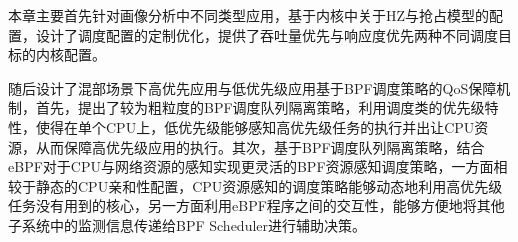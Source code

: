 本章主要首先针对画像分析中不同类型应用，基于内核中关于HZ与抢占模型的配置，设计了调度配置的定制优化，提供了吞吐量优先与响应度优先两种不同调度目标的内核配置。

随后设计了混部场景下高优先应用与低优先级应用基于BPF调度策略的QoS保障机制，首先，提出了较为粗粒度的BPF调度队列隔离策略，利用调度类的优先级特性，使得在单个CPU上，低优先级能够感知高优先级任务的执行并出让CPU资源，从而保障高优先级应用的执行。其次，基于BPF调度队列隔离策略，结合eBPF对于CPU与网络资源的感知实现更灵活的BPF资源感知调度策略，一方面相较于静态的CPU亲和性配置，CPU资源感知的调度策略能够动态地利用高优先级任务没有用到的核心，另一方面利用eBPF程序之间的交互性，能够方便地将其他子系统中的监测信息传递给BPF Scheduler进行辅助决策。